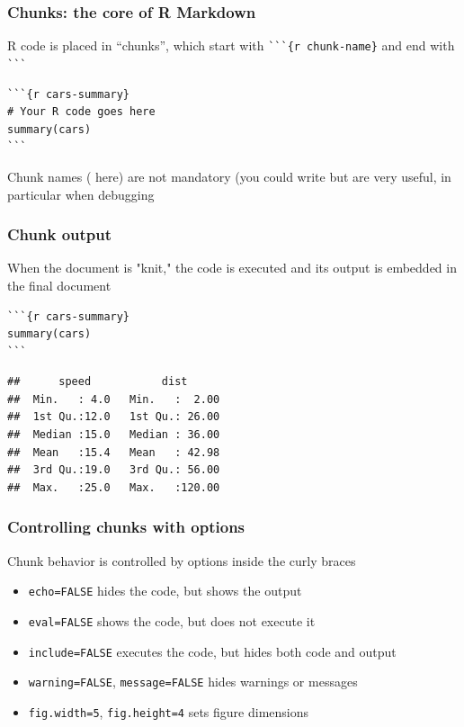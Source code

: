 \documentclass[aspectratio=169]{beamer}\usepackage[]{graphicx}\usepackage[]{xcolor}
\makeatletter
\newenvironment{kframe}{%
 \def\at@end@of@kframe{}%
 \ifinner\ifhmode%
  \def\at@end@of@kframe{\end{minipage}}%
  \begin{minipage}{\columnwidth}%
 \fi\fi%
 \def\FrameCommand##1{\hskip\@totalleftmargin \hskip-\fboxsep
 \colorbox{shadecolor}{##1}\hskip-\fboxsep
     \hskip-\linewidth \hskip-\@totalleftmargin \hskip\columnwidth}%
 \MakeFramed {\advance\hsize-\width
   \@totalleftmargin\z@ \linewidth\hsize
   \@setminipage}}%
 {\par\unskip\endMakeFramed%
 \at@end@of@kframe}
\newenvironment{knitrout}{}{} %
\makeatother
\begin{document}
\begin{frame}[fragile]
  \frametitle{Chunks: the core of R Markdown}
  R code is placed in ``chunks'', which start with \verb|```{r chunk-name}| and end with \verb|```|
\begin{lstlisting}
```{r cars-summary}
# Your R code goes here
summary(cars)
```
\end{lstlisting}
\vfill
Chunk names ( here) are not mandatory (you could write  but are very useful, in particular when debugging
\end{frame}

\begin{frame}[fragile]
  \frametitle{Chunk output}
  When the document is "knit," the  code is executed and its output is embedded in the final document
\begin{lstlisting}
```{r cars-summary}
summary(cars)
```
\end{lstlisting}
\begin{knitrout}
\color{fgcolor}\begin{kframe}
\begin{verbatim}
##      speed           dist       
##  Min.   : 4.0   Min.   :  2.00  
##  1st Qu.:12.0   1st Qu.: 26.00  
##  Median :15.0   Median : 36.00  
##  Mean   :15.4   Mean   : 42.98  
##  3rd Qu.:19.0   3rd Qu.: 56.00  
##  Max.   :25.0   Max.   :120.00
\end{verbatim}
\end{kframe}
\end{knitrout}
\end{frame}

\begin{frame}[fragile]
  \frametitle{Controlling chunks with options}
  Chunk behavior is controlled by options inside the curly braces
  \vfill
  \begin{itemize}
    \item \verb|echo=FALSE| hides the  code, but shows the output
    \vfill
    \item \verb|eval=FALSE| shows the code, but does not execute it
    \vfill
    \item \verb|include=FALSE| executes the code, but hides both code and output
    \vfill
    \item \verb|warning=FALSE|, \verb|message=FALSE| hides warnings or messages
    \vfill
    \item \verb|fig.width=5|, \verb|fig.height=4| sets figure dimensions
  \end{itemize}
\end{frame}
\end{document}
